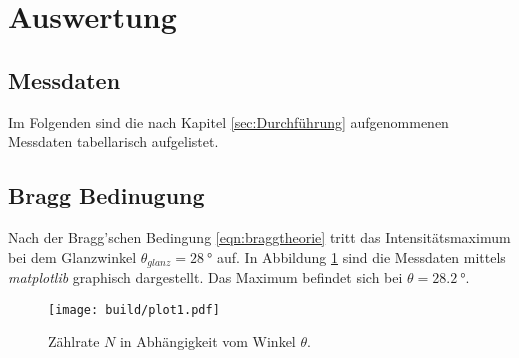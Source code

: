 \section{Auswertung}
\label{sec:Auswertung}
\subsection{Messdaten}
Im Folgenden sind die nach Kapitel \ref{sec:Durchführung} aufgenommenen Messdaten tabellarisch aufgelistet.



\subsection{Bragg Bedinugung}
\label{sec:brag}
Nach der Bragg'schen Bedingung \eqref{eqn:braggtheorie} tritt das Intensitätsmaximum bei dem Glanzwinkel $\theta_{glanz}=\SI{28}{\degree}$ auf.
In Abbildung \ref{fig:plot1} sind die Messdaten mittels \textit{matplotlib} \cite{matplotlib} graphisch dargestellt. Das Maximum befindet
sich bei $\theta=\SI{28.2}{\degree}$.
\begin{figure}[H]
    \centering
    \texttt{[image: build/plot1.pdf]}
    \caption{Zählrate $N$ in Abhängigkeit vom Winkel $\theta$.}
    \label{fig:plot1}
\end{figure}

